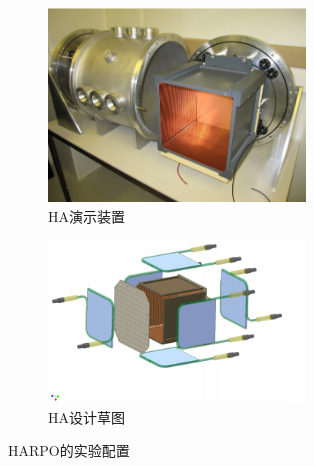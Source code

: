 	\begin{figure}[htbp]
		\centering
		\begin{subfigure}[b]{0.45\textwidth}
			\includegraphics[width=0.75\textwidth]{figures/HA演示装置.png}
			\caption{HA演示装置}
			\label{fig:sub1}
		\end{subfigure}
		\hspace{0.01\textwidth} %
		\begin{subfigure}[b]{0.45\textwidth}
			\includegraphics[width=0.75\textwidth]{figures/HA设计草图.png}
			\caption{HA设计草图}
			\label{fig:sub2}
		\end{subfigure}
		\caption{HARPO的实验配置}
		\label{fig:figures}
	\end{figure}
